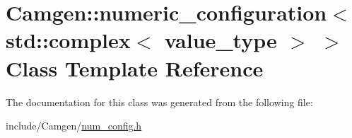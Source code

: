 \hypertarget{a00388}{}\section{Camgen\+:\+:numeric\+\_\+configuration$<$ std\+:\+:complex$<$ value\+\_\+type $>$ $>$ Class Template Reference}
\label{a00388}


The documentation for this class was generated from the following file\+:\begin{DoxyCompactItemize}
\item 
include/\+Camgen/\hyperlink{a00702}{num\+\_\+config.\+h}\end{DoxyCompactItemize}
